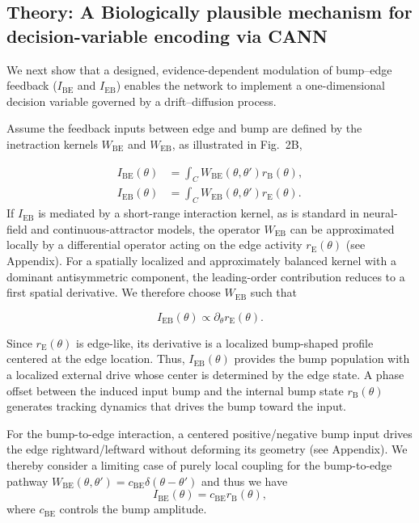 \documentclass{article}
\newcommand{\rB}{r_{\text{B}}}
\newcommand{\rE}{r_{\text{E}}}
\newcommand{\IBE}{I_{\text{BE}}}
\newcommand{\IEB}{I_{\text{EB}}}
\newcommand{\cBE}{c_{\text{BE}}}
\newcommand{\WBE}{W_{\text{BE}}}
\newcommand{\WEB}{W_{\text{EB}}}
\begin{document}
\subsection{Theory: A Biologically plausible mechanism for decision-variable encoding via CANN}
We next show that a designed, evidence-dependent modulation of bump–edge feedback ($\IBE$ and $\IEB$) enables the network to implement a one-dimensional decision variable governed by a drift–diffusion process. 

Assume the feedback inputs between edge and bump are defined by the inetraction kernels $\WBE$ and $\WEB$, as illustrated in Fig.~2B,

\begin{equation}
\begin{aligned}
    \IBE(\theta) &= \int_C \WBE(\theta,\theta') \rB(\theta),\\
    \IEB(\theta) &= \int_C \WEB(\theta,\theta') \rE(\theta).
\end{aligned}
\end{equation}
If $\IEB$ is mediated by a short-range interaction kernel, as is standard in neural-field and continuous-attractor models,
the operator $\WEB$ can be approximated locally by a differential operator acting on the edge activity $\rE(\theta)$ (see Appendix). 
For a spatially localized and approximately balanced kernel with a dominant antisymmetric component, the leading-order contribution reduces to a first spatial derivative. 
We therefore choose $\WEB$ such that

\begin{equation}
 \IEB(\theta) \propto \partial_\theta \rE(\theta).
\end{equation}

Since $\rE(\theta)$ is edge-like, its derivative is a localized bump-shaped profile centered at the edge location. Thus, $\IEB(\theta)$ provides the bump population with a localized external drive whose center is determined by the edge state. A phase offset between the induced input bump and the internal bump state $\rB(\theta)$ generates tracking dynamics that drives the bump toward the input. 

For the bump-to-edge interaction, a centered positive/negative bump input drives the edge rightward/leftward without deforming its geometry (see Appendix). We thereby consider a limiting case of purely local coupling for the bump-to-edge pathway $\WBE(\theta,\theta') = \cBE \delta(\theta-\theta')$ and thus we have
\begin{equation}
\IBE(\theta) = \cBE \rB(\theta),
\end{equation}
where $\cBE$ controls the bump amplitude.
\end{document}
